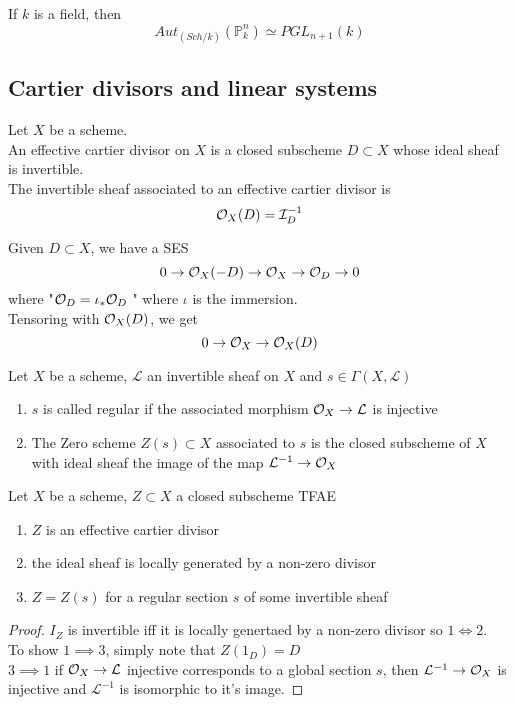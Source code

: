 \documentclass[../main.tex]{subfiles}
\begin{document}
\begin{crly}
If $k$ is a field, then
\[ 
Aut_{( Sch/k) } ( \mathbb{P}^{n}_k) \simeq PGL_{n+1} ( k) 
\]

\end{crly}
\subsection{Cartier divisors and linear systems}
\begin{defn}
	Let $X$ be a scheme.\\
	An effective cartier divisor on $X$ is a closed subscheme $D \subset X$ whose ideal sheaf is invertible.\\
	The invertible sheaf associated to an effective cartier divisor is
	\[ 
	\mathcal{O}_X( D) = \mathcal{I}_D^{-1}
	\]
	
\end{defn}
Given $D \subset X$, we have a SES
\[ 
0 \to \mathcal{O}_X( -D) \to \mathcal{O}_X \to \mathcal{O}_D \to 0
\]
where "$\mathcal{O}_D= \iota_\ast \mathcal{O}_D$ " where $\iota$ is the immersion.\\
Tensoring with $\mathcal{O}_X( D)$, we get
\[ 
0 \to \mathcal{O}_X \to \mathcal{O}_X( D) 
\]
\begin{defn}
	Let $X$  be a scheme, $\mathcal{L}$ an invertible sheaf on $X$ and $s \in \Gamma( X, \mathcal{L}) $ 
	\begin{enumerate}
	\item $s$ is called regular if the associated morphism $\mathcal{O}_X \to \mathcal{L}$ is injective
	\item The Zero scheme $Z( s) \subset X$ associated to $s$ is the closed subscheme of $X$ with ideal sheaf the image of the map $ \mathcal{L}^{-1}\to \mathcal{O}_X$ 
	\end{enumerate}
\end{defn}
\begin{lemma}
Let $X$ be a scheme, $Z \subset X$ a closed subscheme TFAE
\begin{enumerate}
\item $Z$ is an effective cartier divisor
\item the ideal sheaf is locally generated by a non-zero divisor
\item $Z= Z( s) $ for a regular section $s$ of some invertible sheaf
\end{enumerate}
\end{lemma}
\begin{proof}
$I_Z$ is invertible iff it is locally genertaed by a non-zero divisor so $1 \iff 2$.\\
To show $1\implies 3$, simply note that $Z( 1_D) = D$ \\
$3\implies 1$ if $\mathcal{O}_X \to \mathcal{L}$ injective corresponds to a global section $s$, then $ \mathcal{L}^{-1}\to \mathcal{O}_X$ is injective and $ \mathcal{L}^{-1}$ is isomorphic to it's image.
\end{proof}
\end{document}
